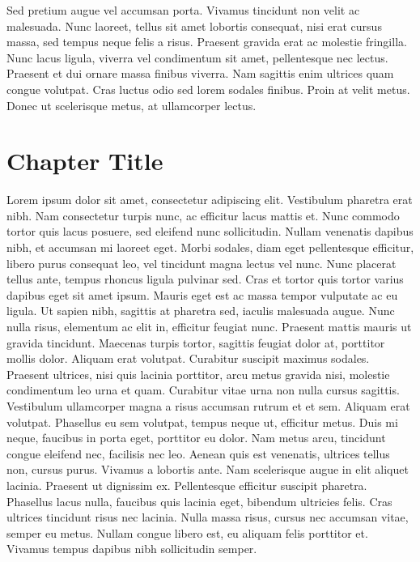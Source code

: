 \documentclass[a4paper]{memoir}
\begin{document}
Sed pretium augue vel accumsan porta. Vivamus tincidunt non velit ac malesuada. Nunc laoreet, tellus sit amet lobortis consequat, nisi erat cursus massa, sed tempus neque felis a risus. Praesent gravida erat ac molestie fringilla. Nunc lacus ligula, viverra vel condimentum sit amet, pellentesque nec lectus. Praesent et dui ornare massa finibus viverra. Nam sagittis enim ultrices quam congue volutpat. Cras luctus odio sed lorem sodales finibus. Proin at velit metus. Donec ut scelerisque metus, at ullamcorper lectus. 

\chapter{Chapter Title}
\label{chaptertitle}

Lorem ipsum dolor sit amet, consectetur adipiscing elit. Vestibulum pharetra erat nibh. Nam consectetur turpis nunc, ac efficitur lacus mattis et. Nunc commodo tortor quis lacus posuere, sed eleifend nunc sollicitudin. Nullam venenatis dapibus nibh, et accumsan mi laoreet eget. Morbi sodales, diam eget pellentesque efficitur, libero purus consequat leo, vel tincidunt magna lectus vel nunc. Nunc placerat tellus ante, tempus rhoncus ligula pulvinar sed. Cras et tortor quis tortor varius dapibus eget sit amet ipsum. Mauris eget est ac massa tempor vulputate ac eu ligula.
Ut sapien nibh, sagittis at pharetra sed, iaculis malesuada augue. Nunc nulla risus, elementum ac elit in, efficitur feugiat nunc. Praesent mattis mauris ut gravida tincidunt. Maecenas turpis tortor, sagittis feugiat dolor at, porttitor mollis dolor. Aliquam erat volutpat. Curabitur suscipit maximus sodales. Praesent ultrices, nisi quis lacinia porttitor, arcu metus gravida nisi, molestie condimentum leo urna et quam.
Curabitur vitae urna non nulla cursus sagittis. Vestibulum ullamcorper magna a risus accumsan rutrum et et sem. Aliquam erat volutpat. Phasellus eu sem volutpat, tempus neque ut, efficitur metus. Duis mi neque, faucibus in porta eget, porttitor eu dolor. Nam metus arcu, tincidunt congue eleifend nec, facilisis nec leo. Aenean quis est venenatis, ultrices tellus non, cursus purus. Vivamus a lobortis ante. Nam scelerisque augue in elit aliquet lacinia. Praesent ut dignissim ex. Pellentesque efficitur suscipit pharetra. Phasellus lacus nulla, faucibus quis lacinia eget, bibendum ultricies felis. Cras ultrices tincidunt risus nec lacinia. Nulla massa risus, cursus nec accumsan vitae, semper eu metus. Nullam congue libero est, eu aliquam felis porttitor et. Vivamus tempus dapibus nibh sollicitudin semper.
\end{document}
